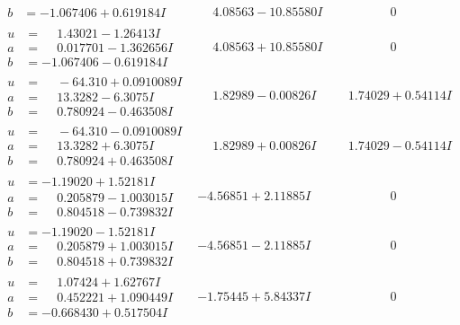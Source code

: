 \documentclass[1p]{elsarticle_modified}
\theoremstyle{definition}
\begin{document}
$$\begin{array}{c|c|c}
\begin{aligned}
b &= -1.067406 + 0.619184 I\end{aligned}
 & \phantom{-}4.08563 - 10.85580 I & \phantom{-0.000000 } 0 \\ \hline\begin{aligned}
u &= \phantom{-}1.43021 - 1.26413 I \\
a &= \phantom{-}0.017701 - 1.362656 I \\
b &= -1.067406 - 0.619184 I\end{aligned}
 & \phantom{-}4.08563 + 10.85580 I & \phantom{-0.000000 } 0 \\ \hline\begin{aligned}
u &= \phantom{-}      -6
4.3 10   + 0.0910089 I \\
a &= \phantom{-}13.3282 - 6.3075 I \\
b &= \phantom{-}0.780924 - 0.463508 I\end{aligned}
 & \phantom{-}1.82989 - 0.00826 I & \phantom{-}1.74029 + 0.54114 I \\ \hline\begin{aligned}
u &= \phantom{-}      -6
4.3 10   - 0.0910089 I \\
a &= \phantom{-}13.3282 + 6.3075 I \\
b &= \phantom{-}0.780924 + 0.463508 I\end{aligned}
 & \phantom{-}1.82989 + 0.00826 I & \phantom{-}1.74029 - 0.54114 I \\ \hline\begin{aligned}
u &= -1.19020 + 1.52181 I \\
a &= \phantom{-}0.205879 - 1.003015 I \\
b &= \phantom{-}0.804518 - 0.739832 I\end{aligned}
 & -4.56851 + 2.11885 I & \phantom{-0.000000 } 0 \\ \hline\begin{aligned}
u &= -1.19020 - 1.52181 I \\
a &= \phantom{-}0.205879 + 1.003015 I \\
b &= \phantom{-}0.804518 + 0.739832 I\end{aligned}
 & -4.56851 - 2.11885 I & \phantom{-0.000000 } 0 \\ \hline\begin{aligned}
u &= \phantom{-}1.07424 + 1.62767 I \\
a &= \phantom{-}0.452221 + 1.090449 I \\
b &= -0.668430 + 0.517504 I\end{aligned}
 & -1.75445 + 5.84337 I & \phantom{-0.000000 } 0 \\ \hline\begin{aligned}

\end{aligned}
\end{array}$$
\end{document}
